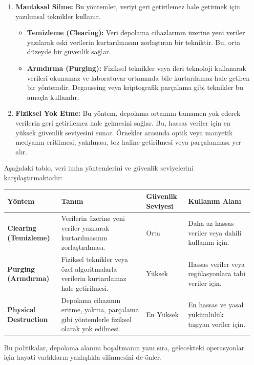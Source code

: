 \begin{enumerate}
    \item \textbf{Mantıksal Silme:} Bu yöntemler, veriyi geri getirilemez hale getirmek için yazılımsal teknikler kullanır.
    \begin{itemize}
        \item \textbf{Temizleme (Clearing):} Veri depolama cihazlarının üzerine yeni veriler yazılarak eski verilerin kurtarılmasını zorlaştıran bir tekniktir. Bu, orta düzeyde bir güvenlik sağlar.
        \item \textbf{Arındırma (Purging):} Fiziksel teknikler veya ileri teknoloji kullanarak verileri okunamaz ve laboratuvar ortamında bile kurtarılamaz hale getiren bir yöntemdir. Degaussing veya kriptografik parçalama gibi teknikler bu amaçla kullanılır.
    \end{itemize}
    \item \textbf{Fiziksel Yok Etme:} Bu yöntem, depolama ortamını tamamen yok ederek verilerin geri getirilemez hale gelmesini sağlar. Bu, hassas veriler için en yüksek güvenlik seviyesini sunar. Örnekler arasında optik veya manyetik medyanın eritilmesi, yakılması, toz haline getirilmesi veya parçalanması yer alır.
\end{enumerate}

Aşağıdaki tablo, veri imha yöntemlerini ve güvenlik seviyelerini karşılaştırmaktadır:

\begin{tabular}{|p{3.5cm}|p{5cm}|p{2.8cm}|p{4.2cm}|}
\hline
\textbf{Yöntem} & \textbf{Tanım} & \textbf{Güvenlik Seviyesi} & \textbf{Kullanım Alanı} \\
\hline
\textbf{Clearing (Temizleme)} & Verilerin üzerine yeni veriler yazılarak kurtarılmasının zorlaştırılması. & Orta & Daha az hassas veriler veya dahili kullanım için. \\
\hline
\textbf{Purging (Arındırma)} & Fiziksel teknikler veya özel algoritmalarla verilerin kurtarılamaz hale getirilmesi. & Yüksek & Hassas veriler veya regülasyonlara tabi veriler için. \\
\hline
\textbf{Physical Destruction} & Depolama cihazının eritme, yakma, parçalama gibi yöntemlerle fiziksel olarak yok edilmesi. & En Yüksek & En hassas ve yasal yükümlülük taşıyan veriler için. \\
\hline
\end{tabular}

Bu politikalar, depolama alanını boşaltmanın yanı sıra, gelecekteki operasyonlar için hayati varlıkların yanlışlıkla silinmesini de önler.

